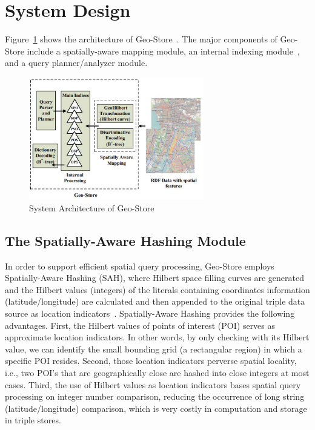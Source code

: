 \section{System Design}

Figure~\ref{fig:architect} shows the architecture of
Geo-Store~\cite{journals/internet/KuCWL}. The major components of
Geo-Store include a spatially-aware mapping module, an internal
indexing module~\cite{DBLP:journals/vldb/NeumannW10}, and a query
planner/analyzer module.

\begin{figure}
\centering
\includegraphics[width=3in]{images/architect.eps}
\caption{System Architecture of Geo-Store}\label{fig:architect}
\end{figure}

\subsection{The Spatially-Aware Hashing Module}

In order to support efficient spatial query processing, Geo-Store
employs Spatially-Aware Hashing (SAH), where Hilbert space filling
curves are generated and the Hilbert values (integers) of the
literals containing coordinates information (latitude/longitude)
are calculated and then appended to the original triple data
source as location indicators~\cite{journals/internet/KuCWL}.
Spatially-Aware Hashing provides the following advantages. First,
the Hilbert values of points of interest (POI) serves as
approximate location indicators. In other words, by only checking
with its Hilbert value, we can identify the small bounding grid (a
rectangular region) in which a specific POI resides. Second, those
location indicators perverse spatial locality, i.e., two POI's
that are geographically close are hashed into close integers at
most cases.  Third, the use of Hilbert values as location
indicators bases spatial query processing on integer number
comparison, reducing the occurrence of long string
(latitude/longitude) comparison, which is very costly in
computation and storage in triple stores.


